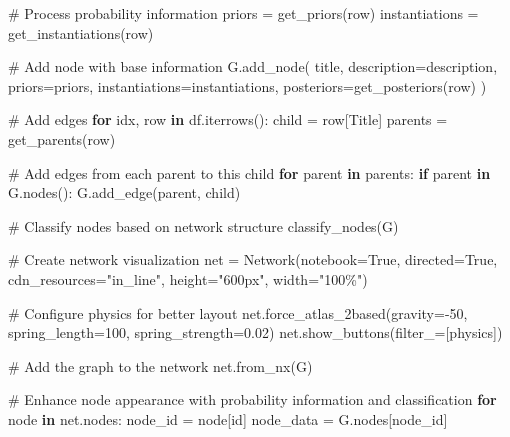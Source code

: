 \documentclass[
  11pt,
  letterpaper,
]{book}
\newenvironment{Shaded}{\begin{snugshade}}{\end{snugshade}}
\newcommand{\CommentTok}[1]{\textcolor[rgb]{0.37,0.37,0.37}{#1}}
\newcommand{\ControlFlowTok}[1]{\textcolor[rgb]{0.00,0.23,0.31}{\textbf{#1}}}
\newcommand{\DecValTok}[1]{\textcolor[rgb]{0.68,0.00,0.00}{#1}}
\newcommand{\FloatTok}[1]{\textcolor[rgb]{0.68,0.00,0.00}{#1}}
\newcommand{\KeywordTok}[1]{\textcolor[rgb]{0.00,0.23,0.31}{\textbf{#1}}}
\newcommand{\NormalTok}[1]{\textcolor[rgb]{0.00,0.23,0.31}{#1}}
\newcommand{\OperatorTok}[1]{\textcolor[rgb]{0.37,0.37,0.37}{#1}}
\newcommand{\StringTok}[1]{\textcolor[rgb]{0.13,0.47,0.30}{#1}}
\newcommand{\VariableTok}[1]{\textcolor[rgb]{0.07,0.07,0.07}{#1}}
\begin{document}
\begin{landscape}
\begin{Shaded}
\begin{Highlighting}[]
        \CommentTok{\# Process probability information}
\NormalTok{        priors }\OperatorTok{=}\NormalTok{ get\_priors(row)}
\NormalTok{        instantiations }\OperatorTok{=}\NormalTok{ get\_instantiations(row)}

        \CommentTok{\# Add node with base information}
\NormalTok{        G.add\_node(}
\NormalTok{            title,}
\NormalTok{            description}\OperatorTok{=}\NormalTok{description,}
\NormalTok{            priors}\OperatorTok{=}\NormalTok{priors,}
\NormalTok{            instantiations}\OperatorTok{=}\NormalTok{instantiations,}
\NormalTok{            posteriors}\OperatorTok{=}\NormalTok{get\_posteriors(row)}
\NormalTok{        )}

    \CommentTok{\# Add edges}
    \ControlFlowTok{for}\NormalTok{ idx, row }\KeywordTok{in}\NormalTok{ df.iterrows():}
\NormalTok{        child }\OperatorTok{=}\NormalTok{ row[}\StringTok{\textquotesingle{}Title\textquotesingle{}}\NormalTok{]}
\NormalTok{        parents }\OperatorTok{=}\NormalTok{ get\_parents(row)}

        \CommentTok{\# Add edges from each parent to this child}
        \ControlFlowTok{for}\NormalTok{ parent }\KeywordTok{in}\NormalTok{ parents:}
            \ControlFlowTok{if}\NormalTok{ parent }\KeywordTok{in}\NormalTok{ G.nodes():}
\NormalTok{                G.add\_edge(parent, child)}

    \CommentTok{\# Classify nodes based on network structure}
\NormalTok{    classify\_nodes(G)}

    \CommentTok{\# Create network visualization}
\NormalTok{    net }\OperatorTok{=}\NormalTok{ Network(notebook}\OperatorTok{=}\VariableTok{True}\NormalTok{, directed}\OperatorTok{=}\VariableTok{True}\NormalTok{, cdn\_resources}\OperatorTok{=}\StringTok{"in\_line"}\NormalTok{, height}\OperatorTok{=}\StringTok{"600px"}\NormalTok{, width}\OperatorTok{=}\StringTok{"100\%"}\NormalTok{)}

    \CommentTok{\# Configure physics for better layout}
\NormalTok{    net.force\_atlas\_2based(gravity}\OperatorTok{={-}}\DecValTok{50}\NormalTok{, spring\_length}\OperatorTok{=}\DecValTok{100}\NormalTok{, spring\_strength}\OperatorTok{=}\FloatTok{0.02}\NormalTok{)}
\NormalTok{    net.show\_buttons(filter\_}\OperatorTok{=}\NormalTok{[}\StringTok{\textquotesingle{}physics\textquotesingle{}}\NormalTok{])}

    \CommentTok{\# Add the graph to the network}
\NormalTok{    net.from\_nx(G)}

    \CommentTok{\# Enhance node appearance with probability information and classification}
    \ControlFlowTok{for}\NormalTok{ node }\KeywordTok{in}\NormalTok{ net.nodes:}
\NormalTok{        node\_id }\OperatorTok{=}\NormalTok{ node[}\StringTok{\textquotesingle{}id\textquotesingle{}}\NormalTok{]}
\NormalTok{        node\_data }\OperatorTok{=}\NormalTok{ G.nodes[node\_id]}


\end{Highlighting}
\end{Shaded}
\end{landscape}
\end{document}
